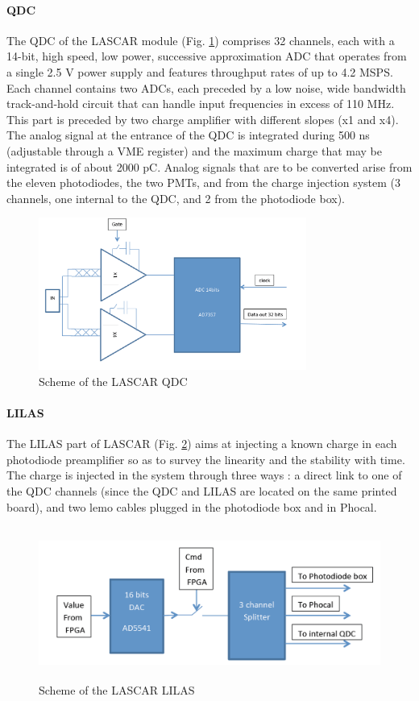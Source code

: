 \paragraph{QDC}

The QDC of the LASCAR module (Fig. \ref{fig:laslascarqdc}) comprises 32 channels, each with a 14-bit, high speed, low power, successive approximation ADC that operates from a single 2.5 V power supply and features throughput rates of up to 4.2 MSPS. Each channel contains two ADCs, each preceded by a low noise, wide bandwidth track-and-hold circuit that can handle input frequencies in excess of 110 MHz. This part is preceded by two charge amplifier with different slopes (x1 and x4). The analog signal at the entrance of the QDC is integrated during 500 ns (adjustable through a VME register) and the maximum charge that may be integrated is of about 2000 pC. Analog signals that are to be converted arise from the eleven photodiodes, the two PMTs, and from the charge injection system (3 channels, one internal to the QDC, and 2 from the photodiode box). 
 
\begin{figure}[htbp]

\centering
\includegraphics[height=5cm]{figures/qdc.pdf}
\caption{Scheme of the LASCAR QDC}\label{fig:laslascarqdc}
\end{figure}

\paragraph{LILAS}
The LILAS part of LASCAR (Fig. \ref{fig:laslascarlilas}) aims at injecting a known charge in each photodiode preamplifier so as to survey the linearity and the stability with time. The charge is injected in the system through three ways : a direct link to one of the QDC channels (since the QDC and LILAS are located on the same printed board), and two lemo cables plugged in the photodiode box and in Phocal.  

\begin{figure}[htbp]

\centering
\includegraphics[height=5cm]{figures/lilas.pdf}
\caption{Scheme of the LASCAR LILAS}\label{fig:laslascarlilas}
\end{figure}

